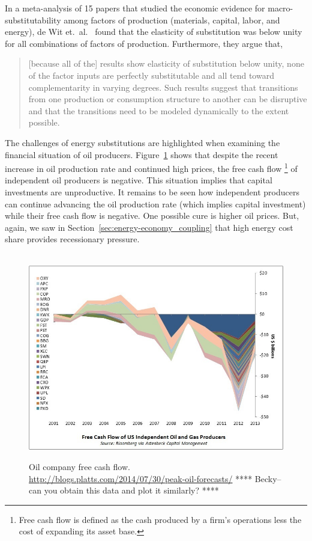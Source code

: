 In a meta-analysis of 15 papers that studied 
the economic evidence for macro-substitutability
among factors of production (materials, capital, labor, and energy), 
de Wit et.\ al.~\cite{de-Wit:2013aa} found that the elasticity of substitution was 
below unity for all combinations of factors of production.
Furthermore, they argue that, 
%
\begin{quote}
	[because all of the] results show elasticity of substitution below unity, 
	none of the factor inputs are perfectly substitutable and 
	all tend toward complementarity in varying degrees. 
	Such results suggest that transitions 
	from one production or consumption structure to another 
	can be disruptive and that the transitions 
	need to be modeled dynamically to the extent possible.\cite[p.~8]{de-Wit:2013aa}
\end{quote}

The challenges of energy substitutions are highlighted
when examining the financial situation of oil producers.
Figure~\ref{fig:oil_company_free_cash_flow} 
shows that despite the recent increase in oil production rate
and continued high prices, 
the free cash flow%
	\footnote{
	Free cash flow is defined as the cash produced by a firm's operations
	less the cost of expanding its asset base.
	}
of independent oil producers is negative.
This situation implies that capital investments are unproductive.
It remains to be seen how independent producers 
can continue advancing the oil production rate (which implies capital investment)
while their free cash flow is negative.
One possible cure is higher oil prices.
But, again, we saw 
in Section~\ref{sec:energy-economy_coupling}
that high energy cost share 
provides recessionary pressure.

\begin{figure}[!ht]
\centering\
\includegraphics[width=\linewidth]{Part_0/Chapter_Introduction/images/Cash-Flow.jpg}
\caption[Oil company free cash flow]{Oil company free cash flow.
\url{http://blogs.platts.com/2014/07/30/peak-oil-forecasts/}
**** Becky--can you obtain this data and plot it similarly? ****
}
\label{fig:oil_company_free_cash_flow}
\end{figure}

